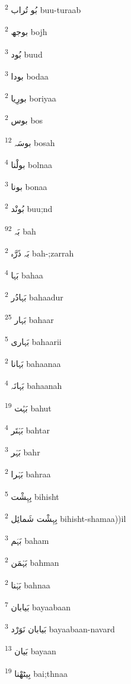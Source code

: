 \documentclass[12pt]{article}
\begin{document}
\begin{RTL}
\begin{multicols}{5}
{\ur بُو تُراب}   \textsuperscript{2} buu-turaab

{\ur بوجھ}   \textsuperscript{2} bojh

{\ur بُود}   \textsuperscript{3} buud

{\ur بودا}   \textsuperscript{3} bodaa

{\ur بورِیا}   \textsuperscript{2} boriyaa

{\ur بوس}   \textsuperscript{2} bos

{\ur بوسَہ}   \textsuperscript{12} bosah

{\ur بولْنا}   \textsuperscript{4} bolnaa

{\ur بونا}   \textsuperscript{3} bonaa

{\ur بُونْد}   \textsuperscript{2} buu;nd

{\ur بَہ}   \textsuperscript{92} bah

{\ur بَہ ذَرَّہ}   \textsuperscript{2} bah-;zarrah

{\ur بَہا}   \textsuperscript{4} bahaa

{\ur بَہادُر}   \textsuperscript{2} bahaadur

{\ur بَہار}   \textsuperscript{25} bahaar

{\ur بَہاری}   \textsuperscript{5} bahaarii

{\ur بَہانا}   \textsuperscript{2} bahaanaa

{\ur بَہانَہ}   \textsuperscript{4} bahaanah

{\ur بَہُت}   \textsuperscript{19} bahut

{\ur بَہْتَر}   \textsuperscript{4} bahtar

{\ur بَہْر}   \textsuperscript{3} bahr

{\ur بَہْرا}   \textsuperscript{2} bahraa

{\ur بِہِشْت}   \textsuperscript{5} bihisht

{\ur بِہِشْت شَمائِل}   \textsuperscript{2} bihisht-shamaa))il

{\ur بَہَم}   \textsuperscript{3} baham

{\ur بَہْمَن}   \textsuperscript{2} bahman

{\ur بَہْنا}   \textsuperscript{2} bahnaa

{\ur بَیابان}   \textsuperscript{7} bayaabaan

{\ur بَیابان نَوَرْد}   \textsuperscript{3} bayaabaan-navard

{\ur بَیان}   \textsuperscript{13} bayaan

{\ur بِیٹھْنا}   \textsuperscript{19} bai;thnaa


\end{multicols}
\end{RTL}
\end{document}
